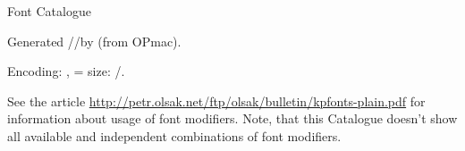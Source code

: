


\def\fontfamexecC#1#2#3#4#5#6#7{\ifx\relax#3\relax \else
   {\testfotenc{#6}\iftrue
       \par
       \noindent {\currtt [#1]\quad \char`\{+#5\char`\} \space(#6)\quad \def\tmp{#7} \detok\tmp}%
       \par\nobreak
       #7
       \edef\basicfont{\fontname\the\font}%
       \def\variants{#3}
       \pcatA {}#2\relax
       \medskip
    \else \par 
       \noindent {\currtt -- [#1] (#6) -- is unavailable in \fotenc\space encoding.}
       \medskip
    \fi}%
  \fi
}
\def\pcatA#1{\ifx#1\relax\par\else
   \def\prefix{#1}\expandafter\pcatB\variants\relax
   \expandafter\pcatA\fi
}
\def\pcatB#1{\ifx#1\relax\par\else
   {\ifx\ffnamegen\undefined \let\ffsetX=\relax \fi
   \ifx\prefix\empty\ffsetX#1\relax\else\prefix#1\relax\fi
   \ifx\ffvarV\undefined \def\ffvarV{x}\fi
   \ifx#1\tt \ifx\prefix\empty\else \def\ffvarV{!}\fi\fi
   \if!\ffvarV\relax \else
   \indent 
   {\currtt \ifx\prefix\empty \else \expandafter\string\prefix\fi \string#1 }%
   \advance\hsize by2in
   \fontfamsample\par
   \fi}%
   \expandafter\pcatB\fi
}
\def\catalogfamsA#1,{\ifx,#1,\else
   \expandafter\addto\expandafter\fontfamL\csname fs:#1\endcsname
   \expandafter\catalogfamsA\fi
}

\nonum\sec Font Catalogue

\begingroup

\ifx\ffdecl\undefined  \fi

\parindent=0pt

Generated \the\day/\the\month/\the\year\space by 
{\tt \string\fontfam[Catalog]} (from OPmac).

Encoding: \fotenc, =\baselineskip
size: \expandafter\ignorept\the\fontdim /\expandafter\ignorept\the{}.

See the article \url{http://petr.olsak.net/ftp/olsak/bulletin/kpfonts-plain.pdf}
for information about usage of font modifiers. Note, that this Catalogue
doesn't show all available and independent combinations of font modifiers.
\bigskip

